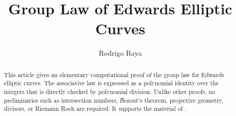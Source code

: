 \documentclass[11pt,a4paper]{article}
\begin{document}
\title{Group Law of Edwards Elliptic Curves}
\author{Rodrigo Raya}
\maketitle

\begin{abstract}
  This article gives an elementary computational proof of the group law for Edwards elliptic curves. The associative law is expressed as a polynomial identity over the integers that is directly checked by polynomial division. Unlike other proofs, no preliminaries such as intersection numbers, B́ezout’s theorem, projective geometry, divisors, or Riemann Roch are required. It supports the material of \cite{10.1007/978-3-030-51054-1_15}.
\end{abstract}

\tableofcontents





\end{document}
